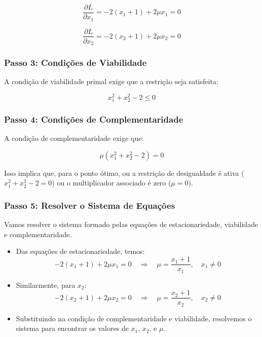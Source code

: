 \documentclass[a4paper, 12pt]{article}
\begin{document}
\begin{equation*}
    \frac{\partial L}{\partial x_1} = -2(x_1 + 1) + 2\mu x_1 = 0
\end{equation*}

\begin{equation*}
    \frac{\partial L}{\partial x_2} = -2(x_2 + 1) + 2\mu x_2 = 0
\end{equation*}

\subsubsection{Passo 3: Condi\c{c}\~oes de Viabilidade}
A condi\c{c}\~ao de viabilidade primal exige que a restri\c{c}\~ao seja satisfeita:

\begin{equation*}
    x_1^2 + x_2^2 - 2 \leq 0
\end{equation*}

\subsubsection{Passo 4: Condi\c{c}\~oes de Complementaridade}
A condi\c{c}\~ao de complementaridade exige que:

\begin{equation*}
    \mu (x_1^2 + x_2^2 - 2) = 0
\end{equation*}

Isso implica que, para o ponto \'otimo, ou a restri\c{c}\~ao de desigualdade \'e ativa ($x_1^2 + x_2^2 - 2 = 0$) ou o multiplicador associado \'e zero ($\mu = 0$).

\subsubsection{Passo 5: Resolver o Sistema de Equa\c{c}\~oes}
Vamos resolver o sistema formado pelas equa\c{c}\~oes de estacionariedade, viabilidade e complementaridade.

\begin{itemize}
    \item Das equa\c{c}\~oes de estacionariedade, temos:
    \begin{equation*}
        -2(x_1 + 1) + 2\mu x_1 = 0 \quad \Rightarrow \quad \mu = \frac{x_1 + 1}{x_1}, \quad x_1 \neq 0
    \end{equation*}
    \item Similarmente, para $x_2$:
    \begin{equation*}
        -2(x_2 + 1) + 2\mu x_2 = 0 \quad \Rightarrow \quad \mu = \frac{x_2 + 1}{x_2}, \quad x_2 \neq 0
    \end{equation*}
    \item Substituindo na condi\c{c}\~ao de complementaridade e viabilidade, resolvemos o sistema para encontrar os valores de $x_1$, $x_2$, e $\mu$.
\end{itemize}
\end{document}

